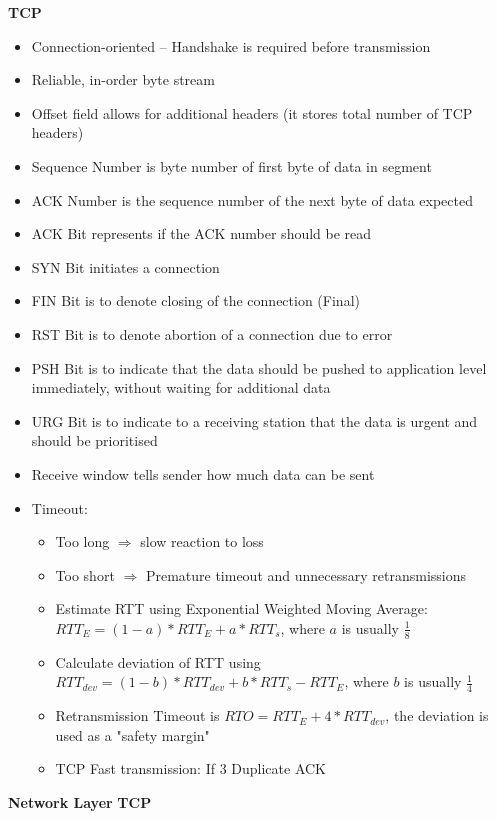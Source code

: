 \documentclass[a4paper]{article} \usepackage[backend=biber, style=numeric, sorting=none]{biblatex}
\begin{document}
\begin{multicols*}{4}
\textbf{TCP}
\begin{itemize}[leftmargin=*]
\item Connection-oriented -- Handshake is required before transmission
\item Reliable, in-order byte stream
\item Offset field allows for additional headers (it stores total number of TCP headers)
\item Sequence Number is byte number of first byte of data in segment
\item ACK Number is the sequence number of the next byte of data expected
\item ACK Bit represents if the ACK number should be read
\item SYN Bit initiates a connection
\item FIN Bit is to denote closing of the connection (Final)
\item RST Bit is to denote abortion of a connection due to error
\item PSH Bit is to indicate that the data should be pushed to application level immediately, without waiting for additional data
\item URG Bit is to indicate to a receiving station that the data is urgent and should be prioritised
\item Receive window tells sender how much data can be sent
\item Timeout:
  \begin{itemize}[leftmargin=*]
  \item Too long $\Rightarrow$ slow reaction to loss
  \item Too short $\Rightarrow$ Premature timeout and unnecessary retransmissions
  \item Estimate RTT using Exponential Weighted Moving Average: $RTT_E = (1 - a) * RTT_E + a * RTT_s$, where $a$ is usually $\frac{1}{8}$
  \item Calculate deviation of RTT using $RTT_{dev} = (1 - b) * RTT_{dev} + b*RTT_s - RTT_E$, where $b$ is usually $\frac{1}{4}$
  \item Retransmission Timeout is $RTO = RTT_{E} + 4 * RTT_{dev}$, the deviation is used as a "safety margin"
  \item TCP Fast transmission: If 3 Duplicate ACK
  \end{itemize}
\end{itemize}

{\small\textbf{Network Layer}}
\textbf{TCP}
\begin{itemize}[leftmargin=*]
\end{itemize}


    \end{multicols*}
\end{document}
